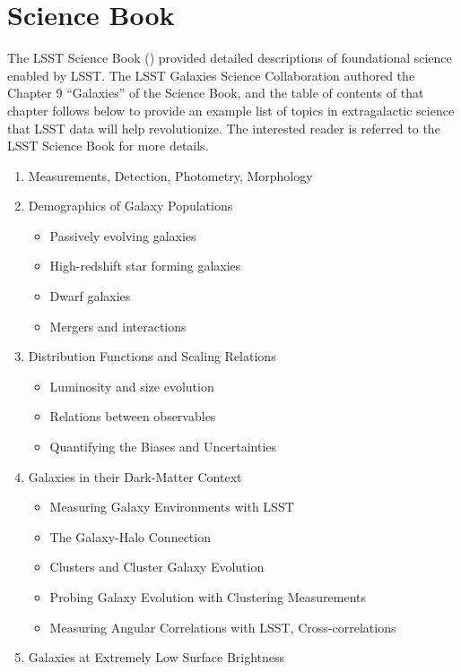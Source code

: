 {\vspace{-0.05in}
\section{Science Book}
\label{sec:sci:gal:bkgnd:scibook}

The LSST Science Book (\citealt{LSSTSciBook}) provided 
detailed descriptions of foundational science enabled
by LSST. The LSST Galaxies Science Collaboration authored
the Chapter 9 ``Galaxies'' of the Science Book, and the
table of contents of that chapter follows below to 
provide an example list of topics in extragalactic
science that LSST data will help revolutionize. The
interested reader is referred to the LSST Science 
Book for more details.


\begin{enumerate}
\item Measurements, Detection, Photometry, Morphology
\item Demographics of Galaxy Populations
\begin{itemize}
\item Passively evolving galaxies
\item High-redshift star forming galaxies
\item Dwarf galaxies
\item Mergers and interactions
\end{itemize}
\item Distribution Functions and Scaling Relations
\begin{itemize}
\item Luminosity and size evolution
\item Relations between observables
\item Quantifying the Biases and Uncertainties
\end{itemize}
\item Galaxies in their Dark-Matter Context
\begin{itemize}
\item Measuring Galaxy Environments with LSST
\item The Galaxy-Halo Connection
\item Clusters and Cluster Galaxy Evolution
\item Probing Galaxy Evolution with Clustering Measurements
\item Measuring Angular Correlations with LSST, Cross-correlations
\end{itemize}
\item Galaxies at Extremely Low Surface Brightness

\end{enumerate}}
